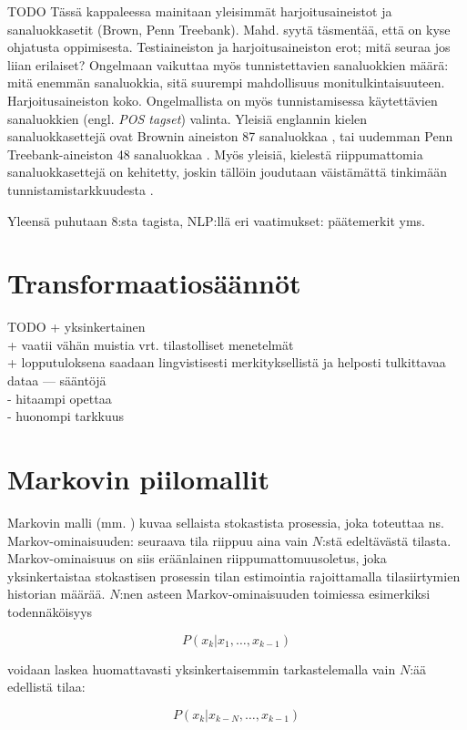 \documentclass[utf8,bachelor,manualbib]{gradu3}
\begin{document}
TODO Tässä kappaleessa mainitaan yleisimmät harjoitusaineistot ja sanaluokkasetit (Brown, Penn Treebank). Mahd. syytä täsmentää, että on kyse ohjatusta oppimisesta. Testiaineiston ja harjoitusaineiston erot; mitä seuraa jos liian erilaiset? Ongelmaan vaikuttaa myös tunnistettavien sanaluokkien määrä: mitä enemmän sanaluokkia, sitä suurempi mahdollisuus monitulkintaisuuteen. Harjoitusaineiston koko. Ongelmallista on myös tunnistamisessa käytettävien sanaluokkien (engl. \emph{POS tagset}) valinta. Yleisiä englannin kielen sanaluokkasettejä ovat Brownin aineiston 87 sanaluokkaa \citep{francis1964}, tai uudemman Penn Treebank-aineiston 48 sanaluokkaa \citep{marcus1993}. Myös yleisiä, kielestä riippumattomia sanaluokkasettejä on kehitetty, joskin tällöin joudutaan väistämättä tinkimään tunnistamistarkkuudesta \citep{petrov2011}.

Yleensä puhutaan 8:sta tagista, NLP:llä eri vaatimukset: päätemerkit yms.


\chapter{Transformaatiosäännöt}

TODO
+ yksinkertainen \\
+ vaatii vähän muistia vrt. tilastolliset menetelmät \\
+ lopputuloksena saadaan lingvistisesti merkityksellistä ja helposti tulkittavaa dataa --- sääntöjä \\
- hitaampi opettaa \\
- huonompi tarkkuus

\chapter{Markovin piilomallit}

Markovin malli (mm. \citealp{rabiner1989}) kuvaa sellaista stokastista prosessia, joka toteuttaa ns. Markov-ominaisuuden: seuraava tila riippuu aina vain $N$:stä edeltävästä tilasta. Markov-ominaisuus on siis eräänlainen riippumattomuusoletus, joka yksinkertaistaa stokastisen prosessin tilan estimointia rajoittamalla tilasiirtymien historian määrää. $N$:nen asteen Markov-ominaisuuden toimiessa esimerkiksi todennäköisyys

\[
P(x_k | x_1, \ldots, x_{k-1})
\]

voidaan laskea huomattavasti yksinkertaisemmin tarkastelemalla vain $N$:ää edellistä tilaa:

\[
P(x_k | x_{k - N }, \ldots, x_{k-1})
\]
\end{document}
